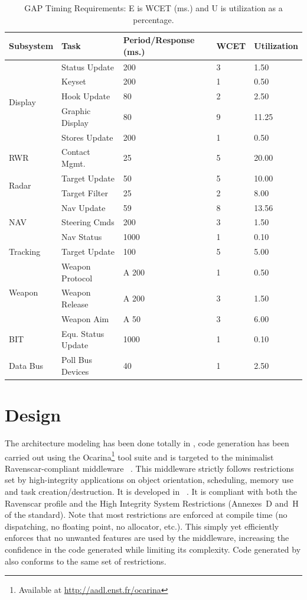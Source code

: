 \begin{table}
\centering
\begin{tabular}{|l|l|l|l|l|}
\hline
\textbf{Subsystem} & \textbf{Task} & \textbf{Period/Response (ms.)} &
  \textbf{WCET} & \textbf{Utilization}\\
\hline
\multirow{5}{*}{Display} & Status Update & 200 & 3 & 1.50\\
 & Keyset & 200 & 1 & 0.50\\
 & Hook Update & 80 & 2 & 2.50\\
 & Graphic Display & 80 & 9 & 11.25\\
 & Stores Update & 200 & 1 & 0.50\\
\hline
RWR & Contact Mgmt. & 25 & 5 & 20.00\\
\hline
\multirow{2}{*}{Radar} & Target Update & 50 & 5 & 10.00\\
 & Target Filter & 25 & 2 & 8.00\\
\hline
\multirow{3}{*}{NAV} & Nav Update & 59 & 8 & 13.56\\
 & Steering Cmds & 200 & 3 & 1.50\\
 & Nav Status & 1000 & 1 & 0.10\\
\hline
Tracking & Target Update & 100 & 5 & 5.00\\
\hline
\multirow{3}{*}{Weapon} & Weapon Protocol & A 200 & 1 & 0.50\\
 & Weapon Release & A 200 & 3 & 1.50\\
 & Weapon Aim & A 50 & 3 & 6.00\\
\hline
BIT & Equ. Status Update & 1000 & 1 & 0.10\\
\hline
Data Bus & Poll Bus Devices & 40 & 1 & 2.50\\
\hline
\end{tabular}
\caption{GAP Timing Requirements: {\normalsize E is WCET (ms.) and U is
    utilization as a percentage}.}
\label{tab:GAP_timing}
\end{table}

\section{Design}
\label{design}
The architecture modeling has been done totally in \aadl, code
generation has been carried out using the Ocarina\footnote{Available
  at \url{http://aadl.enst.fr/ocarina}} tool suite and is targeted to
the minimalist Ravenscar-compliant middleware
\polyorbhi{}~\cite{hugues@isorc07}. This middleware strictly follows
restrictions set by high-integrity applications on object orientation,
scheduling, memory use and task creation/destruction. It is developed
in \newada~\cite{arm05}. It is compliant with both the Ravenscar
profile and the High Integrity System Restrictions (Annexes~D and~H of
the \newada{} standard). Note that most restrictions are enforced at
compile time (no dispatching, no floating point, no allocator,
etc.). This simply yet efficiently enforces that no unwanted features
are used by the middleware, increasing the confidence in the code
generated while limiting its complexity. Code generated by \ocarina{}
also conforms to the same set of restrictions.

